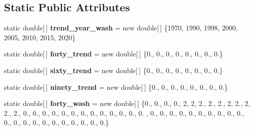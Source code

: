 \subsection*{Static Public Attributes}
\begin{DoxyCompactItemize}
\item 
\hypertarget{classuk_1_1ac_1_1dmu_1_1iesd_1_1cascade_1_1util_1_1_initial_profile_gen_utils_aba704ee9009fb2784312f0df5c17bca5}{static double\mbox{[}$\,$\mbox{]} {\bfseries trend\-\_\-year\-\_\-wash} = new double\mbox{[}$\,$\mbox{]} \{1970, 1990, 1998, 2000, 2005, 2010, 2015, 2020\}}\label{classuk_1_1ac_1_1dmu_1_1iesd_1_1cascade_1_1util_1_1_initial_profile_gen_utils_aba704ee9009fb2784312f0df5c17bca5}

\item 
\hypertarget{classuk_1_1ac_1_1dmu_1_1iesd_1_1cascade_1_1util_1_1_initial_profile_gen_utils_a03e40128ee9306d09548b8ba7e3546f9}{static double\mbox{[}$\,$\mbox{]} {\bfseries forty\-\_\-trend} = new double\mbox{[}$\,$\mbox{]} \{0., 0., 0., 0., 0., 0., 0., 0.\}}\label{classuk_1_1ac_1_1dmu_1_1iesd_1_1cascade_1_1util_1_1_initial_profile_gen_utils_a03e40128ee9306d09548b8ba7e3546f9}

\item 
\hypertarget{classuk_1_1ac_1_1dmu_1_1iesd_1_1cascade_1_1util_1_1_initial_profile_gen_utils_a3eafc6a12d4986e6359af9682f185018}{static double\mbox{[}$\,$\mbox{]} {\bfseries sixty\-\_\-trend} = new double\mbox{[}$\,$\mbox{]} \{0., 0., 0., 0., 0., 0., 0., 0.\}}\label{classuk_1_1ac_1_1dmu_1_1iesd_1_1cascade_1_1util_1_1_initial_profile_gen_utils_a3eafc6a12d4986e6359af9682f185018}

\item 
\hypertarget{classuk_1_1ac_1_1dmu_1_1iesd_1_1cascade_1_1util_1_1_initial_profile_gen_utils_a36b4db11780a5dea507d2ca1fef881b1}{static double\mbox{[}$\,$\mbox{]} {\bfseries ninety\-\_\-trend} = new double\mbox{[}$\,$\mbox{]} \{0., 0., 0., 0., 0., 0., 0., 0.\}}\label{classuk_1_1ac_1_1dmu_1_1iesd_1_1cascade_1_1util_1_1_initial_profile_gen_utils_a36b4db11780a5dea507d2ca1fef881b1}

\item 
\hypertarget{classuk_1_1ac_1_1dmu_1_1iesd_1_1cascade_1_1util_1_1_initial_profile_gen_utils_aefb67d395b5ac952889d87879d0abd20}{static double\mbox{[}$\,$\mbox{]} {\bfseries forty\-\_\-wash} = new double\mbox{[}$\,$\mbox{]} \{0., 0., 0., 0., 2, 2, 2., 2., 2., 2, 2., 2, 2., 2., 0., 0., 0., 0., 0., 0., 0., 0., 0., 0., 0., 0., 0. , 0., 0., 0., 0., 0., 0., 0., 0., 0., 0., 0., 0., 0., 0., 0., 0., 0., 0., 0., 0., 0.\}}\label{classuk_1_1ac_1_1dmu_1_1iesd_1_1cascade_1_1util_1_1_initial_profile_gen_utils_aefb67d395b5ac952889d87879d0abd20}


\end{DoxyCompactItemize}
